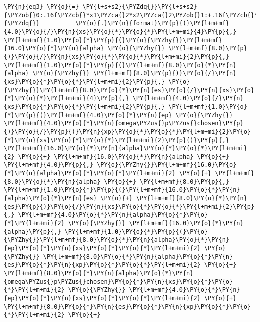 \begin{Verbatim}[commandchars=\\\{\}]
    \PY{n}{eq3} \PY{o}{=} \PY{l+s+s2}{\PYZdq{}}\PY{l+s+s2}{\PYZob{}0:.16f\PYZcb{}*x1\PYZca{}2*x2\PYZca{}2\PYZob{}1:+.16f\PYZcb{}*x1*x2\PYZca{}3\PYZob{}2:+.16f\PYZcb{}*x1*x2\PYZca{}2*x3\PYZob{}3:+.16f\PYZcb{}*x1*x2\PYZca{}2\PYZob{}4:+.16f\PYZcb{}*x1*x2*x3\PYZca{}2\PYZob{}5:+.16f\PYZcb{}*x1*x2*x3\PYZob{}6:+.16f\PYZcb{}*x2\PYZca{}4\PYZob{}7:+.16f\PYZcb{}*x2\PYZca{}3*x3\PYZob{}8:+.16f\PYZcb{}*x2\PYZca{}3\PYZob{}9:+.16f\PYZcb{}*x2\PYZca{}2*x3\PYZca{}2\PYZob{}10:+.16f\PYZcb{}*x2\PYZca{}2*x3\PYZob{}11:+.16f\PYZcb{}*x2\PYZca{}2\PYZob{}12:+.16f\PYZcb{}*x2*x3\PYZca{}3\PYZob{}13:+.16f\PYZcb{}*x2*x3\PYZca{}2\PYZob{}14:+.16f\PYZcb{}*x2*x3\PYZob{}15:+.16f\PYZcb{}*x3\PYZca{}4\PYZob{}16:+.16f\PYZcb{}*x3\PYZca{}3\PYZob{}17:+.16f\PYZcb{}*x3\PYZca{}2\PYZob{}18:+.16f\PYZcb{}*x3;}\PY{l+s+s2}{\PYZdq{}}          \PY{o}{.}\PY{n}{format}\PY{p}{(}\PY{l+m+mf}{4.0}\PY{o}{/}\PY{n}{xs}\PY{o}{*}\PY{o}{*}\PY{l+m+mi}{4}\PY{p}{,} \PY{l+m+mf}{1.0}\PY{o}{*}\PY{p}{(}\PY{o}{\PYZhy{}}\PY{l+m+mf}{16.0}\PY{o}{*}\PY{n}{alpha} \PY{o}{\PYZhy{}} \PY{l+m+mf}{8.0}\PY{p}{)}\PY{o}{/}\PY{n}{xs}\PY{o}{*}\PY{o}{*}\PY{l+m+mi}{2}\PY{p}{,} \PY{l+m+mf}{1.0}\PY{o}{*}\PY{p}{(}\PY{l+m+mf}{8.0}\PY{o}{*}\PY{n}{alpha} \PY{o}{\PYZhy{}} \PY{l+m+mf}{8.0}\PY{p}{)}\PY{o}{/}\PY{n}{xs}\PY{o}{*}\PY{o}{*}\PY{l+m+mi}{2}\PY{p}{,} \PY{o}{\PYZhy{}}\PY{l+m+mf}{8.0}\PY{o}{*}\PY{n}{es}\PY{o}{/}\PY{n}{xs}\PY{o}{*}\PY{o}{*}\PY{l+m+mi}{4}\PY{p}{,} \PY{l+m+mf}{4.0}\PY{o}{/}\PY{n}{xs}\PY{o}{*}\PY{o}{*}\PY{l+m+mi}{2}\PY{p}{,} \PY{l+m+mf}{1.0}\PY{o}{*}\PY{p}{(}\PY{l+m+mf}{4.0}\PY{o}{*}\PY{n}{ep} \PY{o}{\PYZhy{}} \PY{l+m+mf}{4.0}\PY{o}{*}\PY{n}{omega\PYZus{}p\PYZus{}chosen}\PY{p}{)}\PY{o}{/}\PY{p}{(}\PY{n}{xp}\PY{o}{*}\PY{o}{*}\PY{l+m+mi}{2}\PY{o}{*}\PY{n}{xs}\PY{o}{*}\PY{o}{*}\PY{l+m+mi}{2}\PY{p}{)}\PY{p}{,} \PY{l+m+mf}{16.0}\PY{o}{*}\PY{n}{alpha}\PY{o}{*}\PY{o}{*}\PY{l+m+mi}{2} \PY{o}{+} \PY{l+m+mf}{16.0}\PY{o}{*}\PY{n}{alpha} \PY{o}{+} \PY{l+m+mf}{4.0}\PY{p}{,} \PY{o}{\PYZhy{}}\PY{l+m+mf}{16.0}\PY{o}{*}\PY{n}{alpha}\PY{o}{*}\PY{o}{*}\PY{l+m+mi}{2} \PY{o}{+} \PY{l+m+mf}{8.0}\PY{o}{*}\PY{n}{alpha} \PY{o}{+} \PY{l+m+mf}{8.0}\PY{p}{,} \PY{l+m+mf}{1.0}\PY{o}{*}\PY{p}{(}\PY{l+m+mf}{16.0}\PY{o}{*}\PY{n}{alpha}\PY{o}{*}\PY{n}{es} \PY{o}{+} \PY{l+m+mf}{8.0}\PY{o}{*}\PY{n}{es}\PY{p}{)}\PY{o}{/}\PY{n}{xs}\PY{o}{*}\PY{o}{*}\PY{l+m+mi}{2}\PY{p}{,} \PY{l+m+mf}{4.0}\PY{o}{*}\PY{n}{alpha}\PY{o}{*}\PY{o}{*}\PY{l+m+mi}{2} \PY{o}{\PYZhy{}} \PY{l+m+mf}{16.0}\PY{o}{*}\PY{n}{alpha}\PY{p}{,} \PY{l+m+mf}{1.0}\PY{o}{*}\PY{p}{(}\PY{o}{\PYZhy{}}\PY{l+m+mf}{8.0}\PY{o}{*}\PY{n}{alpha}\PY{o}{*}\PY{n}{ep}\PY{o}{*}\PY{n}{xs}\PY{o}{*}\PY{o}{*}\PY{l+m+mi}{2} \PY{o}{\PYZhy{}} \PY{l+m+mf}{8.0}\PY{o}{*}\PY{n}{alpha}\PY{o}{*}\PY{n}{es}\PY{o}{*}\PY{n}{xp}\PY{o}{*}\PY{o}{*}\PY{l+m+mi}{2} \PY{o}{+} \PY{l+m+mf}{8.0}\PY{o}{*}\PY{n}{alpha}\PY{o}{*}\PY{n}{omega\PYZus{}p\PYZus{}chosen}\PY{o}{*}\PY{n}{xs}\PY{o}{*}\PY{o}{*}\PY{l+m+mi}{2} \PY{o}{\PYZhy{}} \PY{l+m+mf}{4.0}\PY{o}{*}\PY{n}{ep}\PY{o}{*}\PY{n}{xs}\PY{o}{*}\PY{o}{*}\PY{l+m+mi}{2} \PY{o}{+} \PY{l+m+mf}{8.0}\PY{o}{*}\PY{n}{es}\PY{o}{*}\PY{n}{xp}\PY{o}{*}\PY{o}{*}\PY{l+m+mi}{2} \PY{o}{+} 
\end{Verbatim}

